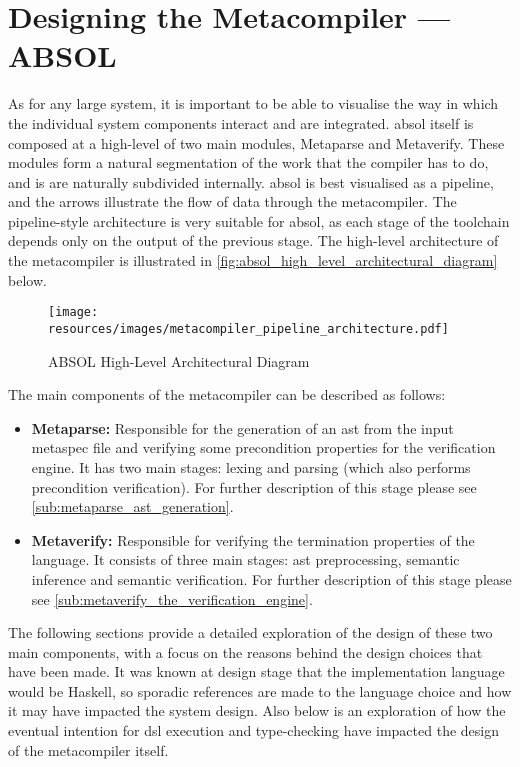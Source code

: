 \section{Designing the Metacompiler --- ABSOL} %
\label{sec:designing_the_metacompiler_absol}
As for any large system, it is important to be able to visualise the way in which the individual system components interact and are integrated. 
\gls{absol} itself is composed at a high-level of two main modules, Metaparse and Metaverify.
These modules form a natural segmentation of the work that the compiler has to do, and is are naturally subdivided internally.
\gls{absol} is best visualised as a pipeline, and the arrows illustrate the flow of data through the metacompiler.
The pipeline-style architecture is very suitable for \gls{absol}, as each stage of the toolchain depends only on the output of the previous stage.
The high-level architecture of the metacompiler is illustrated in \autoref{fig:absol_high_level_architectural_diagram} below.

\begin{figure}[!htb]
    \centering
    \texttt{[image: resources/images/metacompiler\_pipeline\_architecture.pdf]}
    \caption{ABSOL High-Level Architectural Diagram}
    \label{fig:absol_high_level_architectural_diagram}
\end{figure}

The main components of the metacompiler can be described as follows:
\begin{itemize}
    \item \textbf{Metaparse:} Responsible for the generation of an \gls{ast} from the input metaspec file and verifying some precondition properties for the verification engine. 
    It has two main stages: lexing and parsing (which also performs precondition verification). 
    For further description of this stage please see \autoref{sub:metaparse_ast_generation}.
    \item \textbf{Metaverify:} Responsible for verifying the termination properties of the language.
    It consists of three main stages: \gls{ast} preprocessing, semantic inference and semantic verification.
    For further description of this stage please see \autoref{sub:metaverify_the_verification_engine}.
\end{itemize}

The following sections provide a detailed exploration of the design of these two main components, with a focus on the reasons behind the design choices that have been made.
It was known at design stage that the implementation language would be Haskell, so sporadic references are made to the language choice and how it may have impacted the system design.
Also below is an exploration of how the eventual intention for \gls{dsl} execution and type-checking have impacted the design of the metacompiler itself. 

